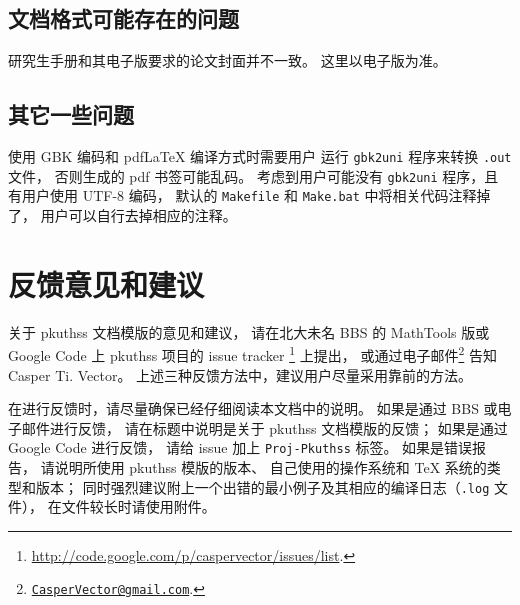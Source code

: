 		\subsection{文档格式可能存在的问题}

		研究生手册和其电子版\supercite{pku-thesisstyle}要求的论文封面并不一致。
		这里以电子版为准。

		\subsection{其它一些问题}

		使用 GBK 编码和 pdf\LaTeX{} 编译方式时需要用户%
		运行 \verb|gbk2uni| 程序来转换 \verb|.out| 文件，
		否则生成的 pdf 书签可能乱码。
		考虑到用户可能没有 \verb|gbk2uni| 程序，且有用户使用 UTF-8 编码，
		默认的 \verb|Makefile| 和 \verb|Make.bat| 中将相关代码注释掉了，
		用户可以自行去掉相应的注释。

	\section{反馈意见和建议}

	关于 pkuthss 文档模版的意见和建议，
	请在北大未名 BBS 的 MathTools 版或 %
	Google Code 上 pkuthss 项目的 issue tracker%
	\footnote{\url{http://code.google.com/p/caspervector/issues/list}.}%
	上提出，
	或通过电子邮件\footnote%
	{\href{mailto:CasperVector@gmail.com}{\texttt{CasperVector@gmail.com}}.}%
	告知 Casper Ti. Vector。
	上述三种反馈方法中，建议用户尽量采用靠前的方法。

	在进行反馈时，请尽量确保已经仔细阅读本文档中的说明。
	如果是通过 BBS 或电子邮件进行反馈，
	请在标题中说明是关于 pkuthss 文档模版的反馈；
	如果是通过 Google Code 进行反馈，
	请给 issue 加上 \verb|Proj-Pkuthss| 标签。
	如果是错误报告，
	请说明所使用 pkuthss 模版的版本、
	自己使用的操作系统和 \TeX{} 系统的类型和版本；
	同时强烈建议附上一个出错的最小例子及其相应的编译日志（\verb|.log| 文件），
	在文件较长时请使用附件。

